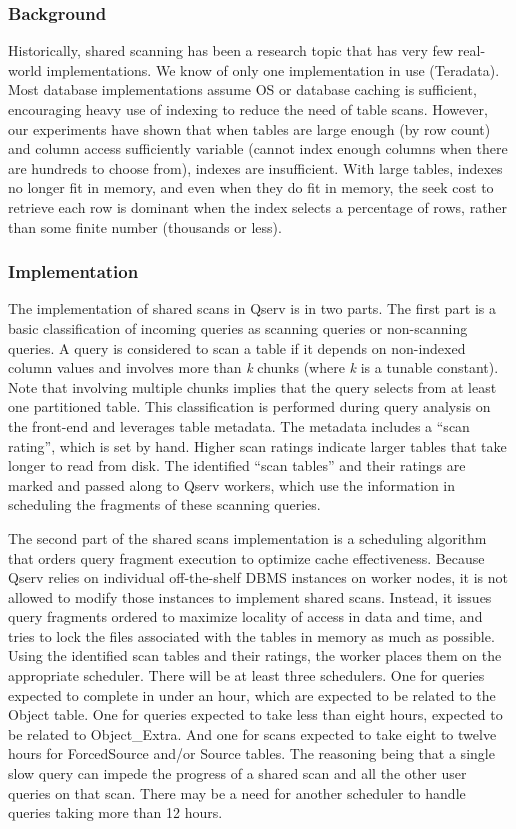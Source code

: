 \documentclass[DM,toc]{lsstdoc}
\begin{document}
\subsubsection{Background}\label{shared-scan-background}

Historically, shared scanning has been a research topic that has very
few real-world implementations. We know of only one implementation in
use (Teradata). Most database implementations assume OS or database
caching is sufficient, encouraging heavy use of indexing to reduce the
need of table scans. However, our experiments have shown that when
tables are large enough (by row count) and column access sufficiently
variable (cannot index enough columns when there are hundreds to choose
from), indexes are insufficient. With large tables, indexes no longer
fit in memory, and even when they do fit in memory, the seek cost to
retrieve each row is dominant when the index selects a percentage of
rows, rather than some finite number (thousands or less).

\subsubsection{Implementation}\label{shared-scan-implementation}

The implementation of shared scans in Qserv is in two parts. The first
part is a basic classification of incoming queries as scanning queries
or non-scanning queries. A query is considered to scan a table if it
depends on non-indexed column values and involves more than \emph{k}
chunks (where \emph{k} is a tunable constant). Note that involving
multiple chunks implies that the query selects from at least one
partitioned table. This classification is performed during query
analysis on the front-end and leverages table metadata. The metadata
includes a ``scan rating'', which is set by hand. Higher scan ratings
indicate larger tables that take longer to read from disk. The
identified ``scan tables'' and their ratings are marked and passed along
to Qserv workers, which use the information in scheduling the fragments
of these scanning queries.

The second part of the shared scans implementation is a scheduling
algorithm that orders query fragment execution to optimize cache
effectiveness. Because Qserv relies on individual off-the-shelf DBMS
instances on worker nodes, it is not allowed to modify those instances
to implement shared scans. Instead, it issues query fragments ordered to
maximize locality of access in data and time, and tries to lock the
files associated with the tables in memory as much as possible. Using
the identified scan tables and their ratings, the worker places them on
the appropriate scheduler. There will be at least three schedulers. One
for queries expected to complete in under an hour, which are expected to
be related to the Object table. One for queries expected to take less
than eight hours, expected to be related to Object\_Extra. And one for
scans expected to take eight to twelve hours for ForcedSource and/or
Source tables. The reasoning being that a single slow query can impede
the progress of a shared scan and all the other user queries on that
scan. There may be a need for another scheduler to handle queries taking
more than 12 hours.
\end{document}
